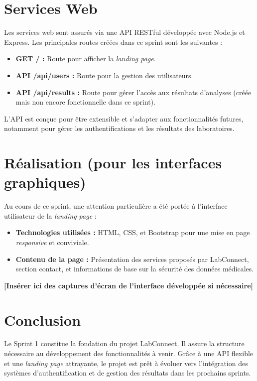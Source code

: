 \documentclass[12pt,a4paper]{report}
\begin{document}
\section{Services Web}

Les services web sont assurés via une API RESTful développée avec Node.js et Express. Les principales routes créées dans ce sprint sont les suivantes :

\begin{itemize}
    \item \textbf{GET / :} Route pour afficher la \textit{landing page}.
    \item \textbf{API /api/users :} Route pour la gestion des utilisateurs.
    \item \textbf{API /api/results :} Route pour gérer l'accès aux résultats d'analyses (créée mais non encore fonctionnelle dans ce sprint).
\end{itemize}

L’API est conçue pour être extensible et s’adapter aux fonctionnalités futures, notamment pour gérer les authentifications et les résultats des laboratoires.

\section{Réalisation (pour les interfaces graphiques)}

Au cours de ce sprint, une attention particulière a été portée à l’interface utilisateur de la \textit{landing page} :

\begin{itemize}
    \item \textbf{Technologies utilisées :} HTML, CSS, et Bootstrap pour une mise en page \textit{responsive} et conviviale.
    \item \textbf{Contenu de la page :} Présentation des services proposés par LabConnect, section contact, et informations de base sur la sécurité des données médicales.
\end{itemize}

\textbf{[Insérer ici des captures d’écran de l’interface développée si nécessaire]}

\section{Conclusion}

Le Sprint 1 constitue la fondation du projet LabConnect. Il assure la structure nécessaire au développement des fonctionnalités à venir. Grâce à une API flexible et une \textit{landing page} attrayante, le projet est prêt à évoluer vers l’intégration des systèmes d’authentification et de gestion des résultats dans les prochains sprints.
\end{document}
